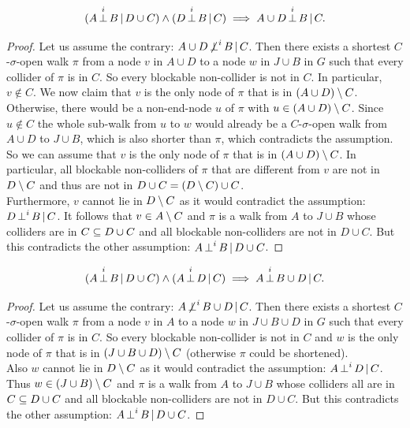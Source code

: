\begin{Lem} 
        \label{s-sep-left-contraction}
    \[ (A \operatorname*{\perp}^i  B \operatorname*{|} D \cup  C) \land (D \operatorname*{\perp}^i  B \operatorname*{|} C) \implies A \cup  D \operatorname*{\perp}^i  B \operatorname*{|} C.\]
\begin{proof}
    Let us assume the contrary:  $A \cup D \operatorname*{\not\perp}^i  B \operatorname*{|} C$.
    Then there exists a shortest $C$-$\sigma$-open walk $\pi$ 
    from a node $v$ in $A \cup D$ to a node $w$ in $J \cup B$ in $G$ such that every collider of $\pi$ is in $C$. 
    So every blockable non-collider is not in $C$. In particular, $v \notin C$.  
    We now claim that $v$ is the only node of $\pi$ that is in $(A \cup D) \setminus C$. 
    Otherwise, there would be a non-end-node $u$ of $\pi$ with $u \in (A \cup D) \setminus C$. 
    Since $u \notin C$ the whole sub-walk from $u$ to $w$ would already be a $C$-$\sigma$-open walk from $A \cup D$ to $J \cup B$,
    which is also shorter than $\pi$, which contradicts the assumption. 
    So we can assume that $v$ is the only node of $\pi$ that is in $(A \cup D) \setminus C$. 
    In particular, all blockable non-colliders of $\pi$ that are different from $v$ are not in $D \setminus C$ 
    and thus are not in $D \cup C = (D \setminus C) \cup C$.\\
    Furthermore, $v$ cannot lie in $D\setminus C$ as it would contradict the assumption: $D \operatorname*{\perp}^i  B \operatorname*{|} C$.
    It follows that $v \in A \setminus C$ and $\pi$ is a walk from $A$ to $J \cup B$ whose colliders are in $C \subseteq D \cup C$ 
    and all blockable non-colliders are not in $D \cup C$.
    But this contradicts the other assumption: $A \operatorname*{\perp}^i  B \operatorname*{|} D \cup  C$.
\end{proof}
\end{Lem}

\begin{Lem}
  \label{s-sep-right-contraction}
    \[ (A \operatorname*{\perp}^i  B \operatorname*{|} D \cup  C) \land (A \operatorname*{\perp}^i  D \operatorname*{|} C)  \implies A \operatorname*{\perp}^i  B \cup  D \operatorname*{|} C.\]
\begin{proof}
    Let us assume the contrary:  $A  \operatorname*{\not\perp}^i  B \cup D \operatorname*{|} C$.
    Then there exists a shortest $C$-$\sigma$-open walk $\pi$ 
    from a node $v$ in $A$ to a node $w$ in $J \cup B \cup D$ in $G$ such that  every collider of $\pi$ is in $C$.
    So every blockable non-collider is not in $C$ and $w$ is 
    the only node of $\pi$ that is in $(J \cup B \cup D)\setminus C$ (otherwise $\pi$ could be shortened). \\
    Also $w$ cannot lie in $D\setminus C$ as it would contradict the assumption: $A \operatorname*{\perp}^i  D \operatorname*{|} C$.
    Thus $w \in (J \cup B) \setminus C$ and $\pi$ is a walk from $A$ to $J \cup B$ whose colliders all are in $C \subseteq D \cup C$ 
    and all blockable non-colliders are not in $D \cup C$.
    But this contradicts the other assumption: $A \operatorname*{\perp}^i  B \operatorname*{|} D \cup  C$.
\end{proof}
\end{Lem}

